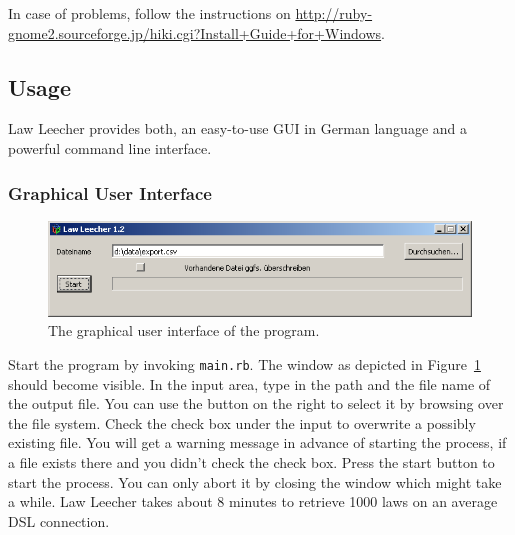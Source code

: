 \documentclass{scrartcl}
\begin{document}
In case of problems, follow the instructions on \url{http://ruby-gnome2.sourceforge.jp/hiki.cgi?Install+Guide+for+Windows}.

\subsection{Usage}
Law Leecher provides both, an easy-to-use GUI in German language and a powerful command line interface.

\subsubsection{Graphical User Interface}
\begin{figure}[ht]
\begin{center}
\includegraphics[width = \textwidth]{GUI.png}
\caption{The graphical user interface of the program.}
\label{fig:guiwindow}
\end{center}
\end{figure}

Start the program by invoking \texttt{main.rb}. The window as depicted in Figure~\ref{fig:guiwindow} should become visible. In the input area, type in the path and the file name of the output file. You can use the button on the right to select it by browsing over the file system. Check the check box under the input to overwrite a possibly existing file. You will get a warning message in advance of starting the process, if a file exists there and you didn't check the check box. Press the start button to start the process. You can only abort it by closing the window which might take a while. Law Leecher takes about 8 minutes to retrieve 1000 laws on an average DSL connection.
\end{document}
